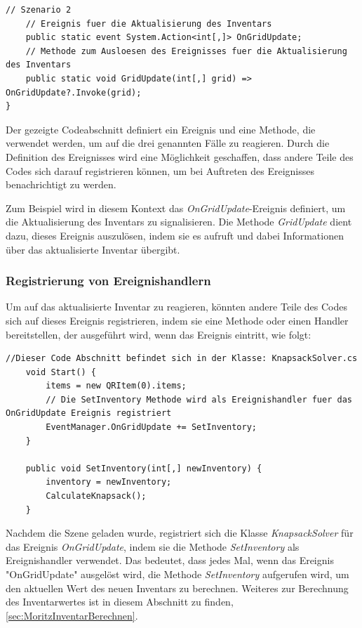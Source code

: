 \begin{itemize}
\begin{lstlisting}[style=csharp, label=code:EventManager]
    // Szenario 2
    // Ereignis fuer die Aktualisierung des Inventars
    public static event System.Action<int[,]> OnGridUpdate;
    // Methode zum Ausloesen des Ereignisses fuer die Aktualisierung des Inventars
    public static void GridUpdate(int[,] grid) => OnGridUpdate?.Invoke(grid);
}
\end{lstlisting}

Der gezeigte Codeabschnitt definiert ein Ereignis und eine Methode, die verwendet werden, um auf die drei genannten Fälle zu reagieren. Durch die Definition des Ereignisses wird eine Möglichkeit geschaffen, dass andere Teile des Codes sich darauf registrieren können, um bei Auftreten des Ereignisses benachrichtigt zu werden.

Zum Beispiel wird in diesem Kontext das \textit{OnGridUpdate}-Ereignis definiert, um die Aktualisierung des Inventars zu signalisieren. Die Methode \textit{GridUpdate} dient dazu, dieses Ereignis auszulösen, indem sie es aufruft und dabei Informationen über das aktualisierte Inventar übergibt.

\subsubsection*{Registrierung von Ereignishandlern}
Um auf das aktualisierte Inventar zu reagieren, könnten andere Teile des Codes sich auf dieses Ereignis registrieren, indem sie eine Methode oder einen Handler bereitstellen, der ausgeführt wird, wenn das Ereignis eintritt, wie folgt:

\begin{lstlisting}[style=csharp label=code:Event Registration]
    //Dieser Code Abschnitt befindet sich in der Klasse: KnapsackSolver.cs
    void Start() {
        items = new QRItem(0).items;
        // Die SetInventory Methode wird als Ereignishandler fuer das OnGridUpdate Ereignis registriert
        EventManager.OnGridUpdate += SetInventory;
    }

    public void SetInventory(int[,] newInventory) {
        inventory = newInventory;
        CalculateKnapsack();
    }
\end{lstlisting}

Nachdem die Szene geladen wurde, registriert sich die Klasse \textit{KnapsackSolver} für das Ereignis \textit{OnGridUpdate}, indem sie die Methode \textit{SetInventory} als Ereignishandler verwendet. Das bedeutet, dass jedes Mal, wenn das Ereignis "OnGridUpdate" ausgelöst wird, die Methode \textit{SetInventory} aufgerufen wird, um den aktuellen Wert des neuen Inventars zu berechnen. Weiteres zur Berechnung des Inventarwertes ist in diesem Abschnitt zu finden, \ref{sec:MoritzInventarBerechnen}.


\end{itemize}
